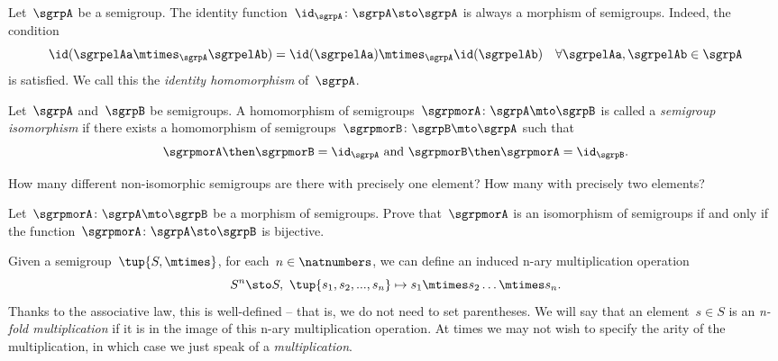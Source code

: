 \begin{definition}
\label{def:identity-sgrp-mor}
Let~$\sgrpA$ be a semigroup. The identity function~$\id_\sgrpA\colon \sgrpA \sto \sgrpA$ is always a morphism of semigroups. Indeed, the condition
\begin{equation}
\id (\sgrpelAa \mtimes_{\sgrpA} \sgrpelAb) = \id (\sgrpelAa) \mtimes_{\sgrpA} \id(\sgrpelAb) \quad \forall \sgrpelAa, \sgrpelAb \in \sgrpA
\end{equation}
is satisfied. We call this the \emph{identity homomorphism} of~$\sgrpA$.
\end{definition}

\begin{definition}
\label{def:semigroup-iso}
Let~$\sgrpA$ and~$\sgrpB$ be semigroups. A homomorphism of semigroups~$\sgrpmorA\colon \sgrpA \mto \sgrpB$ is called a \emph{semigroup isomorphism} if there exists a homomorphism of semigroups~$\sgrpmorB\colon \sgrpB \mto \sgrpA$ such that
\begin{equation}
\label{sgrp-iso-cond}
\sgrpmorA \then \sgrpmorB = \id_\sgrpA \text{ and }  \sgrpmorB \then \sgrpmorA = \id_\sgrpB.
\end{equation}
\end{definition}

\begin{exercise}
\label{ex:non-isomorphic}
How many different non-isomorphic semigroups are there with precisely one element? How many with precisely two elements?
\end{exercise}
\begin{solution}
\end{solution}

\begin{exercise}
\label{ex:semi-morph}
Let~$\sgrpmorA\colon \sgrpA \mto \sgrpB$ be a morphism of semigroups. Prove that~$\sgrpmorA$ is an isomorphism of semigroups if and only if the function~$\sgrpmorA\colon \sgrpA \sto \sgrpB$ is bijective.
\end{exercise}
\begin{solution}
\end{solution}



Given a semigroup~$\tup{S, \mtimes}$, for each~$n \in \natnumbers$, we can define an induced n-ary multiplication operation
\begin{equation*}
S^n \sto S, \ \tup{s_1, s_2, ..., s_n} \mapsto s_1 \mtimes s_2 \dots \mtimes s_n.
\end{equation*}
Thanks to the associative law, this is well-defined -- that is, we do not need to set parentheses.
We will say that an element~$s \in S$ is an \emph{n-fold multiplication} if it is in the image of this n-ary multiplication operation.
At times we may not wish to specify the arity of the multiplication, in which case we just speak of a \emph{multiplication}.